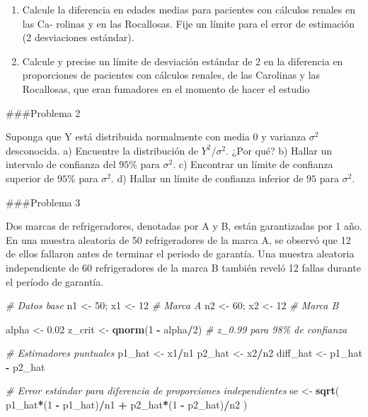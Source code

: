 \documentclass[
]{article}
\newenvironment{Shaded}{\begin{snugshade}}{\end{snugshade}}
\newcommand{\CommentTok}[1]{\textcolor[rgb]{0.56,0.35,0.01}{\textit{#1}}}
\newcommand{\DecValTok}[1]{\textcolor[rgb]{0.00,0.00,0.81}{#1}}
\newcommand{\FloatTok}[1]{\textcolor[rgb]{0.00,0.00,0.81}{#1}}
\newcommand{\FunctionTok}[1]{\textcolor[rgb]{0.13,0.29,0.53}{\textbf{#1}}}
\newcommand{\NormalTok}[1]{#1}
\newcommand{\OtherTok}[1]{\textcolor[rgb]{0.56,0.35,0.01}{#1}}
\newcommand{\SpecialCharTok}[1]{\textcolor[rgb]{0.81,0.36,0.00}{\textbf{#1}}}
\begin{document}
\begin{enumerate}
\def\labelenumi{\alph{enumi})}
\item
  Calcule la diferencia en edades medias para pacientes con cálculos
  renales en las Ca- rolinas y en las Rocallosas. Fije un límite para el
  error de estimación (2 desviaciones estándar).
\item
  Calcule y precise un límite de desviación estándar de 2 en la
  diferencia en proporciones de pacientes con cálculos renales, de las
  Carolinas y las Rocallosas, que eran fumadores en el momento de hacer
  el estudio
\end{enumerate}

\#\#\#Problema 2

Suponga que Y está distribuida normalmente con media \(0\) y varianza
\(\sigma^2\) desconocida. a) Encuentre la distribución de
\(Y^2/ \sigma^2\). ¿Por qué? b) Hallar un intervalo de confianza del
\(95\%\) para \(\sigma^2\). c) Encontrar un límite de confianza superior
de \(95\%\) para \(\sigma^2\). d) Hallar un límite de confianza inferior
de \(95%
\) para \(\sigma^2\).

\#\#\#Problema 3

Dos marcas de refrigeradores, denotadas por A y B, están garantizadas
por 1 año. En una muestra aleatoria de 50 refrigeradores de la marca A,
se observó que 12 de ellos fallaron antes de terminar el periodo de
garantía. Una muestra aleatoria independiente de 60 refrigeradores de la
marca B también reveló 12 fallas durante el período de garantía.

\begin{Shaded}
\begin{Highlighting}[]
\CommentTok{\# Datos base}
\NormalTok{n1 }\OtherTok{\textless{}{-}} \DecValTok{50}\NormalTok{; x1 }\OtherTok{\textless{}{-}} \DecValTok{12}   \CommentTok{\# Marca A}
\NormalTok{n2 }\OtherTok{\textless{}{-}} \DecValTok{60}\NormalTok{; x2 }\OtherTok{\textless{}{-}} \DecValTok{12}   \CommentTok{\# Marca B}

\NormalTok{alpha }\OtherTok{\textless{}{-}} \FloatTok{0.02}
\NormalTok{z\_crit }\OtherTok{\textless{}{-}} \FunctionTok{qnorm}\NormalTok{(}\DecValTok{1} \SpecialCharTok{{-}}\NormalTok{ alpha}\SpecialCharTok{/}\DecValTok{2}\NormalTok{)  }\CommentTok{\# z\_0.99 para 98\% de confianza}

\CommentTok{\# Estimadores puntuales}
\NormalTok{p1\_hat }\OtherTok{\textless{}{-}}\NormalTok{ x1}\SpecialCharTok{/}\NormalTok{n1}
\NormalTok{p2\_hat }\OtherTok{\textless{}{-}}\NormalTok{ x2}\SpecialCharTok{/}\NormalTok{n2}
\NormalTok{diff\_hat }\OtherTok{\textless{}{-}}\NormalTok{ p1\_hat }\SpecialCharTok{{-}}\NormalTok{ p2\_hat}

\CommentTok{\# Error estándar para diferencia de proporciones independientes}
\NormalTok{se }\OtherTok{\textless{}{-}} \FunctionTok{sqrt}\NormalTok{( p1\_hat}\SpecialCharTok{*}\NormalTok{(}\DecValTok{1} \SpecialCharTok{{-}}\NormalTok{ p1\_hat)}\SpecialCharTok{/}\NormalTok{n1 }\SpecialCharTok{+}\NormalTok{ p2\_hat}\SpecialCharTok{*}\NormalTok{(}\DecValTok{1} \SpecialCharTok{{-}}\NormalTok{ p2\_hat)}\SpecialCharTok{/}\NormalTok{n2 )}
\end{Highlighting}
\end{Shaded}
\end{document}
